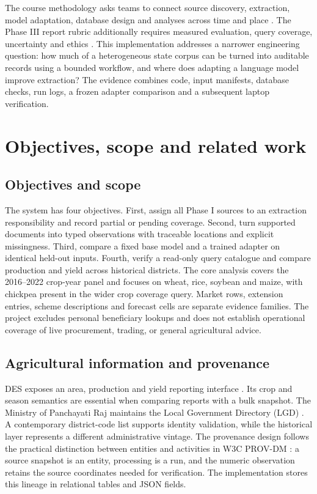 \documentclass[11pt,a4paper]{article}
\begin{document}
The course methodology asks teams to connect source discovery, extraction, model adaptation, database design and analyses across time and place \cite{method}. The Phase III report rubric additionally requires measured evaluation, query coverage, uncertainty and ethics \cite{phase3}. This implementation addresses a narrower engineering question: how much of a heterogeneous state corpus can be turned into auditable records using a bounded workflow, and where does adapting a language model improve extraction? The evidence combines code, input manifests, database checks, run logs, a frozen adapter comparison and a subsequent laptop verification.

\clearpage
\section{Objectives, scope and related work}
\subsection{Objectives and scope}
The system has four objectives. First, assign all Phase I sources to an extraction responsibility and record partial or pending coverage. Second, turn supported documents into typed observations with traceable locations and explicit missingness. Third, compare a fixed base model and a trained adapter on identical held-out inputs. Fourth, verify a read-only query catalogue and compare production and yield across historical districts. The core analysis covers the 2016--2022 crop-year panel and focuses on wheat, rice, soybean and maize, with chickpea present in the wider crop coverage query. Market rows, extension entries, scheme descriptions and forecast cells are separate evidence families. The project excludes personal beneficiary lookups and does not establish operational coverage of live procurement, trading, or general agricultural advice.

\subsection{Agricultural information and provenance}
DES exposes an area, production and yield reporting interface \cite{des}. Its crop and season semantics are essential when comparing reports with a bulk snapshot. The Ministry of Panchayati Raj maintains the Local Government Directory (LGD) \cite{lgd}. A contemporary district-code list supports identity validation, while the historical layer represents a different administrative vintage. The provenance design follows the practical distinction between entities and activities in W3C PROV-DM \cite{prov}: a source snapshot is an entity, processing is a run, and the numeric observation retains the source coordinates needed for verification. The implementation stores this lineage in relational tables and JSON fields.
\end{document}

